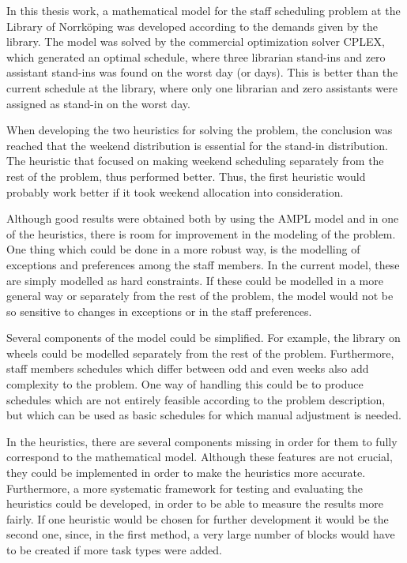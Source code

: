 In this thesis work, a mathematical model for the staff scheduling problem at the Library of Norrköping was developed according to the demands given by the library. The model was solved by the commercial optimization solver CPLEX, which generated an optimal schedule, where three librarian stand-ins and zero assistant stand-ins was found on the worst day (or days). This is better than the current schedule at the library, where only one librarian and zero assistants were assigned as stand-in on the worst day.

When developing the two heuristics for solving the problem, the conclusion was reached that the weekend distribution is essential for the stand-in distribution. The heuristic that focused on making weekend scheduling separately from the rest of the problem, thus performed better. Thus, the first heuristic would probably work better if it took weekend allocation into consideration.

Although good results were obtained both by using the AMPL model and in one of the heuristics, there is room for improvement in the modeling of the problem. One thing which could be done in a more robust way, is the modelling of exceptions and preferences among the staff members. In the current model, these are simply modelled as hard constraints. If these could be modelled in a more general way or separately from the rest of the problem, the model would not be so sensitive to changes in exceptions or in the staff preferences.

Several components of the model could be simplified. For example, the library on wheels could be modelled separately from the rest of the problem. Furthermore, staff members schedules which differ between odd and even weeks also add complexity to the problem. One way of handling this could be to produce schedules which are not entirely feasible according to the problem description, but which can be used as basic schedules for which manual adjustment is needed.

In the heuristics, there are several components missing in order for them to fully correspond to the mathematical model. Although these features are not crucial, they could be implemented in order to make the heuristics more accurate. Furthermore, a more systematic framework for testing and evaluating the heuristics could be developed, in order to be able to measure the results more fairly. If one heuristic would be chosen for further development it would be the second one, since, in the first method, a very large number of blocks would have to be created if more task types were added.



